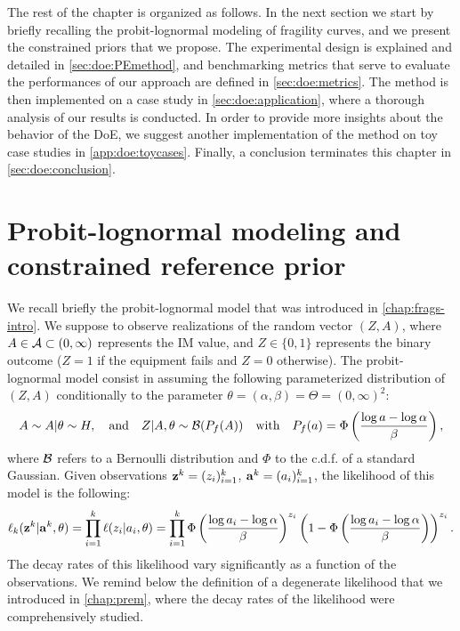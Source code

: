 The rest of the chapter is organized as follows. In the next section we start by briefly recalling the probit-lognormal modeling of fragility curves, and we 
present the constrained priors that we propose.
The experimental design is explained and detailed in \cref{sec:doe:PEmethod}, and benchmarking metrics that serve to evaluate the performances of our approach are defined in \cref{sec:doe:metrics}. 
The method is then implemented on a case study in \cref{sec:doe:application}, where a thorough analysis of our results is conducted.
In order to provide more insights about the behavior of the DoE, we suggest another implementation of the method on toy case studies in \cref{app:doe:toycases}. Finally, a conclusion terminates this chapter in \cref{sec:doe:conclusion}.






\section{Probit-lognormal modeling and constrained reference prior}\label{sec:doe:model}

We recall briefly the probit-lognormal model that was introduced in \cref{chap:frags-intro}. We suppose to observe realizations of the random vector $(Z,A)$, where $A\in\mathcal{A}\subset(0,\infty)$ represents the IM value, and $Z\in\{0,1\}$ represents the binary outcome ($Z=1$ if the equipment fails and $Z=0$ otherwise).
The probit-lognormal model consist in assuming the following parameterized distribution of $(Z,A)$ conditionally to the parameter $\theta=(\alpha,\beta)=\Theta=(0,\infty)^2$:
    \begin{equation}
        A\sim A|\theta\sim H,\quad\text{and}\quad Z|A,\theta\sim\mathcal{B}(P_f(A))\quad\text{with}\quad P_f(a)=\Phi\left(\frac{\log a-\log\alpha}{\beta}\right),
    \end{equation}
where $\mathcal{B}$ refers to a Bernoulli distribution and $\Phi$ to the c.d.f. of a standard Gaussian.
Given observations $\mathbf{z}^k=(z_i)_{i=1}^k$, $\mathbf{a}^k=(a_i)_{i=1}^k$, the likelihood of this model is the following:
    \begin{equation}
        \ell_k(\mathbf{z}^k|\mathbf{a}^k,\theta) = \prod_{i=1}^{k}\ell(z_i|a_i,\theta) = \prod_{i=1}^k\Phi\left(\frac{\log a_i-\log\alpha}{\beta}\right)^{z_i}\left(1-\Phi\left(\frac{\log a_i-\log\alpha}{\beta}\right)\right)^{z_i}.
    \end{equation}
The decay rates of this likelihood vary significantly as a function of the observations. We remind below the definition of a degenerate likelihood that we introduced in \cref{chap:prem}, where the decay rates of the likelihood were comprehensively studied.

